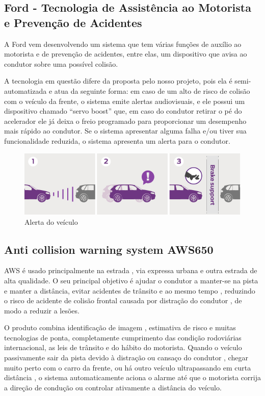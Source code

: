 \subsection{Ford - Tecnologia de Assistência ao Motorista e Prevenção de Acidentes}
A Ford vem desenvolvendo um sistema que tem várias funções de auxílio ao motorista e de prevenção de acidentes, entre elas, um dispositivo que avisa ao condutor sobre uma possível colisão.

A tecnologia em questão difere da proposta pelo nosso projeto, pois ela é semi-automatizada e atua da seguinte forma: em caso de um alto de risco de colisão com o veículo da frente, o sistema emite alertas audiovisuais, e ele possui um dispositivo chamado “servo boost” que, em caso do condutor retirar o pé do acelerador ele já deixa o freio programado para proporcionar um desempenho mais rápido ao condutor. Se o sistema apresentar alguma falha e/ou tiver sua funcionalidade reduzida, o sistema apresenta um alerta para o condutor.

\begin{figure}[h]
  \centering
  \includegraphics[width=450px, scale=0.5]{figuras/sistemaford}
  \caption{Alerta do veículo}
  \label{fig:sistemaford}
\end{figure}

\subsection{Anti collision warning system AWS650}
AWS é usado principalmente na estrada , via expressa urbana e outra estrada de alta qualidade. O seu principal objetivo é ajudar o condutor a manter-se na pista e manter a distância, evitar acidentes de trânsito e ao mesmo tempo , reduzindo o risco de acidente de colisão frontal causada por distração do condutor , de modo a reduzir a lesões.

O produto combina identificação de imagem , estimativa de risco e muitas tecnologias de ponta, completamente cumprimento das condição rodoviárias internacional, as leis de trânsito e do hábito do motorista. Quando o veículo passivamente sair da pista devido à distração ou cansaço do condutor , chegar muito perto com o carro da frente, ou há outro veículo ultrapassando em curta distância , o sistema automaticamente aciona o alarme até que o motorista corrija a direção de condução ou controlar ativamente a distância do  veículo.

